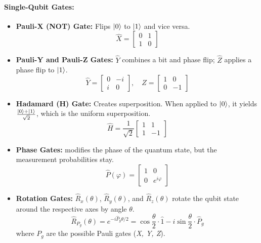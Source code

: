 \documentclass[encoding=utf8,british]{tumphthesis}
\begin{document}
        \paragraph{Single-Qubit Gates:}
        \begin{itemize}
            \item \textbf{Pauli-X (NOT) Gate:} Flips $\left|0\right>$ to $\left|1\right>$ and vice versa.
            \begin{equation*}
                \hat{X} = \begin{bmatrix}0 & 1 \\ 1 & 0\end{bmatrix}
            \end{equation*}
            \item \textbf{Pauli-Y and Pauli-Z Gates:} $\hat{Y}$ combines a bit and phase flip; $\hat{Z}$ applies a phase flip to $\left|1\right>$.
            \begin{equation*}
                \hat{Y} = \begin{bmatrix}0 & -i \\ i & 0\end{bmatrix}, \quad \hat{Z} = \begin{bmatrix}1 & 0 \\ 0 & -1\end{bmatrix}
            \end{equation*}
            \item \textbf{Hadamard (H) Gate:} Creates superposition. When applied to $\left|0\right>$, it yields $\frac{\left|0\right> + \left|1\right>}{\sqrt{2}}$, which is the uniform superposition.
            \begin{equation*}
                \hat{H} = \frac{1}{\sqrt{2}}\begin{bmatrix}1 & 1 \\ 1 & -1\end{bmatrix}
            \end{equation*}
            \item \textbf{Phase Gates:} modifies the phase of the quantum state, but the measurement probabilities stay.
            \begin{equation*}
                \hat{P}(\varphi) = \begin{bmatrix} 1 & 0 \\ 0 & e^{i\varphi} \end{bmatrix}
            \end{equation*}
            \item \textbf{Rotation Gates:} $\hat{R}_x(\theta)$, $\hat{R}_y(\theta)$, and $\hat{R}_z(\theta)$ rotate the qubit state around the respective axes by 
            angle $\theta$.
            \begin{equation*}
                \hat{R}_{P_g}(\theta) = e^{-i\hat{P}_g\theta/2} = \cos{\frac{\theta}{2}} \cdot \hat{1} - i \sin{\frac{\theta}{2}} \cdot \hat{P}_g
            \end{equation*}
            where $P_g$ are the possible Pauli gates (\textit{X, Y, Z}).
        \end{itemize}
\end{document}
